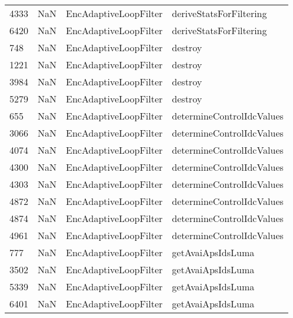 \begin{tabular}{llll}
4333 &                   NaN &      EncAdaptiveLoopFilter &                   deriveStatsForFiltering \\
6420 &                   NaN &      EncAdaptiveLoopFilter &                   deriveStatsForFiltering \\
748  &                   NaN &      EncAdaptiveLoopFilter &                                   destroy \\
1221 &                   NaN &      EncAdaptiveLoopFilter &                                   destroy \\
3984 &                   NaN &      EncAdaptiveLoopFilter &                                   destroy \\
5279 &                   NaN &      EncAdaptiveLoopFilter &                                   destroy \\
655  &                   NaN &      EncAdaptiveLoopFilter &                 determineControlIdcValues \\
3066 &                   NaN &      EncAdaptiveLoopFilter &                 determineControlIdcValues \\
4074 &                   NaN &      EncAdaptiveLoopFilter &                 determineControlIdcValues \\
4300 &                   NaN &      EncAdaptiveLoopFilter &                 determineControlIdcValues \\
4303 &                   NaN &      EncAdaptiveLoopFilter &                 determineControlIdcValues \\
4872 &                   NaN &      EncAdaptiveLoopFilter &                 determineControlIdcValues \\
4874 &                   NaN &      EncAdaptiveLoopFilter &                 determineControlIdcValues \\
4961 &                   NaN &      EncAdaptiveLoopFilter &                 determineControlIdcValues \\
777  &                   NaN &      EncAdaptiveLoopFilter &                         getAvaiApsIdsLuma \\
3502 &                   NaN &      EncAdaptiveLoopFilter &                         getAvaiApsIdsLuma \\
5339 &                   NaN &      EncAdaptiveLoopFilter &                         getAvaiApsIdsLuma \\
6401 &                   NaN &      EncAdaptiveLoopFilter &                         getAvaiApsIdsLuma \\

\end{tabular}
